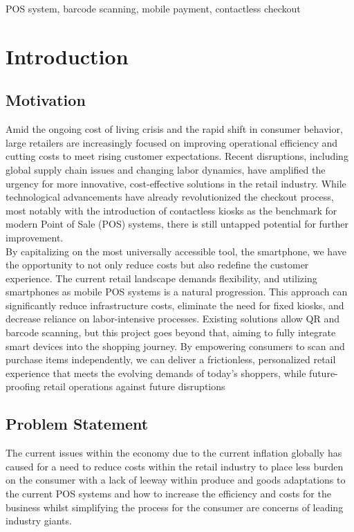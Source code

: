 \documentclass[conference]{IEEEtran}
\begin{document}
\begin{IEEEkeywords}
POS system, barcode scanning, mobile payment, contactless checkout
\end{IEEEkeywords}

\section{Introduction}

\subsection{Motivation}
Amid the ongoing cost of living crisis and the rapid shift in consumer behavior, large retailers are increasingly focused on improving operational efficiency and cutting costs to meet rising customer expectations. Recent disruptions, including global supply chain issues and changing labor dynamics, have amplified the urgency for more innovative, cost-effective solutions in the retail industry. While technological advancements have already revolutionized the checkout process, most notably with the introduction of contactless kiosks as the benchmark for modern Point of Sale (POS) systems, there is still untapped potential for further improvement. \\
By capitalizing on the most universally accessible tool, the smartphone, we have the opportunity to not only reduce costs but also redefine the customer experience. The current retail landscape demands flexibility, and utilizing smartphones as mobile POS systems is a natural progression. This approach can significantly reduce infrastructure costs, eliminate the need for fixed kiosks, and decrease reliance on labor-intensive processes. Existing solutions allow QR and barcode scanning, but this project goes beyond that, aiming to fully integrate smart devices into the shopping journey. By empowering consumers to scan and purchase items independently, we can deliver a frictionless, personalized retail experience that meets the evolving demands of today's shoppers, while future-proofing retail operations against future disruptions 

\subsection{Problem Statement}
The current issues within the economy due to the current inflation globally has caused for a need to reduce costs within the retail industry to place less burden on the consumer with a lack of leeway within produce and goods adaptations to the current POS systems and how to increase the efficiency and costs for the business whilst simplifying the process for the consumer are concerns of leading industry giants. \\
\end{document}
